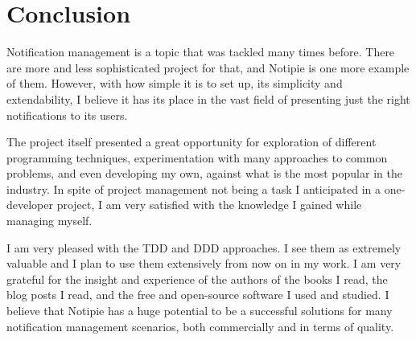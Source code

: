 \section{Conclusion}\label{sec:conclusion}

Notification management is a topic
that was tackled many times before.
There are more and less sophisticated
project for that,
and Notipie is one more example of them.
However,
with how simple it is to set up,
its simplicity and extendability,
I believe it has its place
in the vast field of
presenting just the right notifications
to its users.

The project itself presented a great opportunity
for exploration of different programming techniques,
experimentation with many approaches to common problems,
and even developing my own,
against what is the most popular in the industry.
In spite of project management
not being a task I anticipated
in a one-developer project,
I am very satisfied with the knowledge
I gained while managing myself.

I am very pleased with the \ac{TDD} and \ac{DDD} approaches.
I see them as extremely valuable
and I plan to use them extensively
from now on in my work.
I am very grateful for the insight
and experience of the authors of the books I read,
the blog posts I read,
and the free and open-source software
I used and studied.
I believe that Notipie has a huge potential
to be a successful solutions for many
notification management scenarios,
both commercially
and in terms of quality.
